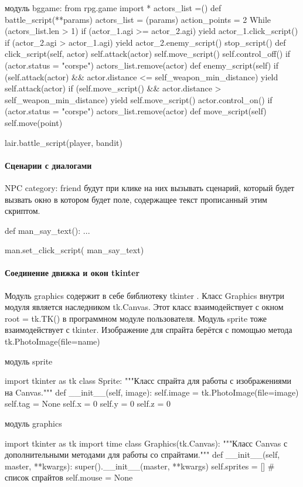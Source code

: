 модуль bggame:
from rpg.game import *
actors\_list =()
def battle\_script(**params)
	actors\_list = (params)
	action\_points = 2
	While (actors\_list.len > 1)
		if (actor\_1.agi >= actor\_2.agi)
			yield actor\_1.click\_script()
		if (actor\_2.agi > actor\_1.agi)
		yield actor\_2.enemy\_script()
	stop\_script()
def click\_script(self, actor)
	 self.attack(actor)
	 self.move\_script()
	 self.control\_off()
	 if (actor.status = "corspe")
	 	actors\_list.remove(actor)
def enemy\_script(self)
	if (self.attack(actor) \&\& actor.distance <= self\_weapon\_min\_distance)
		yield self.attack(actor)
	if (self.move\_script() \&\& actor.distance > self\_weapon\_min\_distance)
		yield self.move\_script()
	actor.control\_on()
	if (actor.status = "corspe")
		actors\_list.remove(actor)
def move\_script(self)
	self.move(point)

lair.battle\_script(player, bandit)

\paragraph{Сценарии с диалогами}
NPC category: friend будут при клике на них вызывать сценарий, который будет вызвать окно в котором будет поле, содержащее текст прописанный этим скриптом. 

def man\_say\_text():
...

man.set\_click\_script( man\_say\_text)

\paragraph{Соединение движка и окон tkinter}
Модуль graphics содержит в себе библиотеку tkinter . Класс Graphics внутри модуля является наследником tk.Canvas. Этот класс взаимодействует с окном root = tk.TK() в программном модуле пользователя. Модуль sprite тоже взаимодействует с tkinter. Изображение для спрайта берётся с помощью метода tk.PhotoImage(file=name)

модуль sprite

import tkinter as tk
class Sprite:
"""Класс спрайта для работы с изображениями на Canvas."""
def \_\_init\_\_(self, image):
self.image = tk.PhotoImage(file=image)
self.tag = None
self.x = 0
self.y = 0
self.z = 0

модуль graphics

import tkinter as tk
import time
class Graphics(tk.Canvas):
"""Класс Canvas с дополнительными методами для работы со спрайтами."""
def \_\_init\_\_(self, master, **kwargs):
super().\_\_init\_\_(master, **kwargs)
self.sprites = []  \# список спрайтов
self.mouse = None

